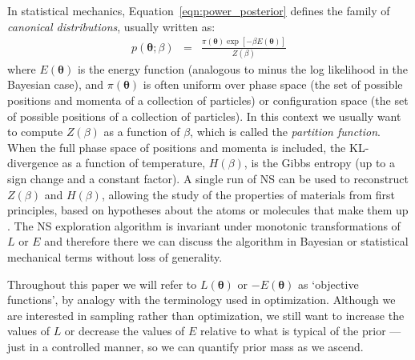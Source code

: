 \documentclass[entropy,article,submit,moreauthors,pdftex,10pt,a4paper]{Definitions/mdpi}
\newcommand{\xx}{\boldsymbol{\theta}}
\begin{document}
In statistical mechanics, Equation~\ref{eqn:power_posterior} defines the
family of {\it canonical distributions}, usually written as:
\begin{eqnarray}
p(\xx; \beta) &=& \frac{\pi(\xx)\exp[-\beta E(\xx)]}{Z(\beta)}
\end{eqnarray}
where $E(\xx)$ is the energy function (analogous to minus the log likelihood
in the Bayesian case), and $\pi(\xx)$ is often uniform over
phase space (the set of possible positions and momenta of a collection of
particles) or configuration space (the set of possible positions of a collection
of particles). In this context we usually want to
compute $Z(\beta)$ as a function of $\beta$, which is called the
{\it partition function}. When the full phase space of positions and momenta
is included, the KL-divergence as a function of temperature,
$H(\beta)$, is the Gibbs entropy (up to a sign change and a constant factor).
A single run of NS can be used to reconstruct $Z(\beta)$ and $H(\beta)$,
allowing the study of
the properties of materials from first principles, based on hypotheses about
the atoms or molecules that make them up
\citep[e.g.][]{partay2010efficient, baldock2016determining}.
The NS exploration algorithm is invariant under
monotonic transformations of $L$ or $E$ and therefore there we can discuss the
algorithm in Bayesian or statistical mechanical terms without loss of
generality.

Throughout this paper we will refer to $L(\xx)$ or
$-E(\xx)$ as `objective functions',
by analogy with the terminology used in optimization.
Although we are interested in sampling rather
than optimization, we still want to increase the values of $L$ or decrease
the values of $E$ relative to what is typical of the prior --- just in
a controlled manner, so we can quantify prior mass as we ascend.
\end{document}
